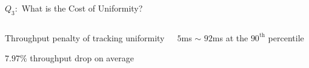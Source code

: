 \begin{frame}{$Q_{3}:$ What is the Cost of Uniformity?}
  \begin{columns}
    \begin{center}
      \vspace{-0.20cm}
      {\footnotesize Throughput penalty of tracking uniformity}

      \vspace{0.30cm}
      $7.97\%$ throughput drop on average
    \end{center}
    \begin{center}

      \vspace{0.30cm}
      $5$ms $\sim$ $92$ms at the $90^{\text{th}}$ percentile
    \end{center}
  \end{columns}
\end{frame}
